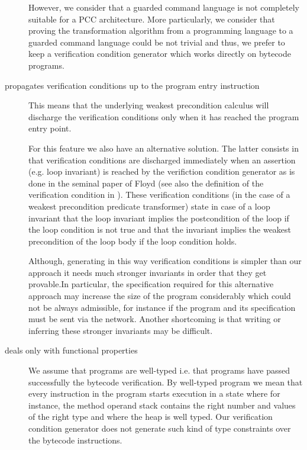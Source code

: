\begin{description}
	However, we consider that a guarded command language 
	is not completely suitable for a PCC architecture.
	More particularly, we consider that proving the transformation algorithm from a programming language to a 
	guarded command language could be not trivial and thus, we prefer to keep a verification condition generator 
	which works directly on bytecode programs. 




   \item [propagates verification conditions up to the program entry instruction]
         This means that the underlying weakest precondition calculus will discharge the verification 
	 conditions only when it has reached the program entry point. 

         For this feature we also have an alternative solution. The latter consists in
	 that verification conditions are discharged immediately when an assertion (e.g. loop invariant)
	 is reached by the verifiction condition generator as is done in the seminal paper of Floyd \cite{F67amp}
	 (see also the definition of the verification condition in \cite{gta05:fast}).
	 These verification conditions (in the case of a weakest precondition predicate transformer) state in case of a loop invariant
	 that the loop invariant implies the postcondition of the loop if the loop condition is not true and that the invariant implies the weakest precondition 
	 of the loop body if the loop condition holds.

	 Although, generating in this way verification conditions is simpler 
	 than our approach it needs much stronger invariants in order that they get provable.In particular, the specification 
	 required for this alternative approach may increase the size of the program considerably which could not be always admissible,
	 for instance if the program and its specification must be sent via the network.
	 Another shortcoming is that writing or inferring these stronger invariants
	 may be difficult. 
	 

  \item [deals only with functional properties] 
        We assume that programs are well-typed i.e. that programs
	have passed successfully the bytecode verification. By well-typed program we mean that  every
	instruction in the program starts execution in a  state where for instance, the method operand
	stack contains the right number and values of the right type
	and where the heap is well typed. Our 
	verification condition generator does not generate such kind of type constraints over 
	the bytecode instructions.
	

\end{description}
